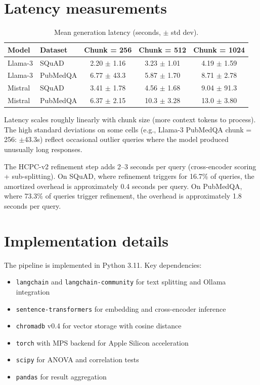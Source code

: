 \FloatBarrier
\section{Latency measurements}
\label{app:latency}

\begin{table}[!htb]
\centering
\caption{Mean generation latency (seconds, $\pm$ std dev).}
\label{tab:latency}
\small
\begin{tabular}{llccc}
\toprule
Model & Dataset & Chunk = 256 & Chunk = 512 & Chunk = 1024 \\
\midrule
Llama-3  & SQuAD    & 2.20 $\pm$ 1.16 & 3.23 $\pm$ 1.01 & 4.19 $\pm$ 1.59 \\
Llama-3  & PubMedQA & 6.77 $\pm$ 43.3 & 5.87 $\pm$ 1.70 & 8.71 $\pm$ 2.78 \\
Mistral  & SQuAD    & 3.41 $\pm$ 1.78 & 4.56 $\pm$ 1.68 & 9.04 $\pm$ 91.3 \\
Mistral  & PubMedQA & 6.37 $\pm$ 2.15 & 10.3 $\pm$ 3.28 & 13.0 $\pm$ 3.80 \\
\bottomrule
\end{tabular}
\end{table}

Latency scales roughly linearly with chunk size (more context tokens
to process). The high standard deviations on some cells (e.g., Llama-3
PubMedQA chunk = 256: $\pm$43.3s) reflect occasional outlier queries
where the model produced unusually long responses.

The HCPC-v2 refinement step adds 2--3 seconds per query (cross-encoder
scoring + sub-splitting). On SQuAD, where refinement triggers for 16.7\%
of queries, the amortized overhead is approximately 0.4 seconds per query.
On PubMedQA, where 73.3\% of queries trigger refinement, the overhead is
approximately 1.8 seconds per query.

\FloatBarrier
\section{Implementation details}
\label{app:implementation}

The pipeline is implemented in Python 3.11. Key dependencies:

\begin{itemize}
  \item \texttt{langchain} and \texttt{langchain-community} for
        text splitting and Ollama integration
  \item \texttt{sentence-transformers} for embedding and cross-encoder
        inference
  \item \texttt{chromadb} v0.4 for vector storage with cosine distance
  \item \texttt{torch} with MPS backend for Apple Silicon acceleration
  \item \texttt{scipy} for ANOVA and correlation tests
  \item \texttt{pandas} for result aggregation
\end{itemize}

